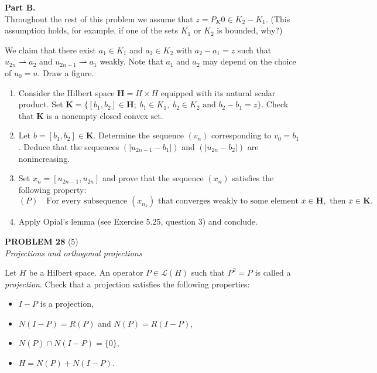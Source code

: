 \documentclass[12pt]{article}
\newcommand{\abs}[1]{\left|#1\right|}
\begin{document}
\noindent\textbf{Part B.}\\
Throughout the rest of this problem we assume that $z = P_K 0 \in K_2 - K_1$. (This
assumption holds, for example, if one of the sets $K_1$ or $K_2$ is bounded, why?)
 
\medskip
 
\noindent We claim that there exist $a_1 \in K_1$ and $a_2 \in K_2$ with $a_2 - a_1 = z$ such that
$u_{2n} \rightharpoonup a_2$ and $u_{2n-1} \rightharpoonup a_1$ weakly. Note that $a_1$ and $a_2$ may depend on
the choice of $u_0 = u$. Draw a figure.
 
\begin{enumerate}
\item Consider the Hilbert space $\mathbf{H} = H \times H$ equipped with its natural scalar product.
Set $\mathbf{K} = \{[b_1, b_2] \in \mathbf{H};\; b_1 \in K_1,\; b_2 \in K_2 \text{ and } b_2 - b_1 = z\}$.
Check that $\mathbf{K}$ is a nonempty closed convex set.
 
\item Let $b = [b_1, b_2] \in \mathbf{K}$. Determine the sequence $(v_n)$ corresponding to $v_0 = b_1$.
Deduce that the sequences $(\abs{u_{2n-1} - b_1})$ and $(\abs{u_{2n} - b_2})$ are nonincreasing.
 
\item Set $x_n = [u_{2n-1}, u_{2n}]$ and prove that the sequence $(x_n)$ satisfies the following property:
\[
(P)\quad \text{For every subsequence } (x_{n_k}) \text{ that converges weakly to some}
\text{ element } \bar{x} \in \mathbf{H}, \text{ then } \bar{x} \in \mathbf{K}.
\]
 
\item Apply Opial's lemma (see Exercise 5.25, question 3) and conclude.
\end{enumerate}
 
\bigskip
 
\noindent\textbf{PROBLEM 28} (5)\\[4pt]
\textit{Projections and orthogonal projections}
 
\medskip
 
Let $H$ be a Hilbert space. An operator $P \in \mathcal{L}(H)$ such that $P^2 = P$ is called a
\emph{projection}. Check that a projection satisfies the following properties:
\begin{itemize}
\item[(a)] $I - P$ is a projection,
\item[(b)] $N(I-P) = R(P)$ and $N(P) = R(I-P)$,
\item[(c)] $N(P) \cap N(I-P) = \{0\}$,
\item[(d)] $H = N(P) + N(I-P)$.
\end{itemize}
 
\end{document}
